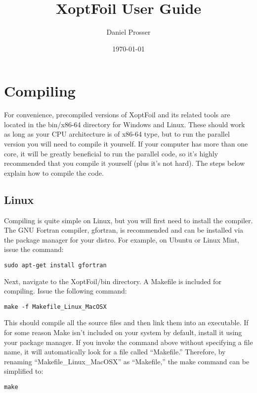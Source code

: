 \documentclass[11pt]{article}
\begin{document}
\title{XoptFoil User Guide}
\author{Daniel Prosser}
\date{\today}
\maketitle

\tableofcontents

\section{Compiling}

For convenience, precompiled versions of XoptFoil and its related tools are
located in the bin/x86-64 directory for Windows and Linux. These should work as long as
your CPU architecture is of x86-64 type, but to run the parallel version you will need to
compile it yourself. If your computer has more than one core, it will be greatly
beneficial to run the parallel code, so it's highly recommended that you compile it
yourself (plus it's not hard). The steps below explain how to compile the code.

\subsection{Linux}

Compiling is quite simple on Linux, but you will first need to install the compiler. The
GNU Fortran compiler, gfortran, is recommended and can be installed via the package
manager for your distro.  For example, on Ubuntu or Linux Mint, issue the command:

\begin{verbatim}
sudo apt-get install gfortran
\end{verbatim}

Next, navigate to the XoptFoil/bin directory.  A Makefile is included for compiling. Issue
the following command:

\begin{verbatim}
make -f Makefile_Linux_MacOSX
\end{verbatim}

This should compile all the source files and then link them into an executable.  If for
some reason Make isn't included on your system by default, install it using your package 
manager. If you invoke the command above without specifying a file name, it will 
automatically look
for a file called ``Makefile.''  Therefore, by renaming ``Makefile\_Linux\_MacOSX'' as
``Makefile,'' the make command can be simplified to:

\begin{verbatim}
make
\end{verbatim}
\end{document}
